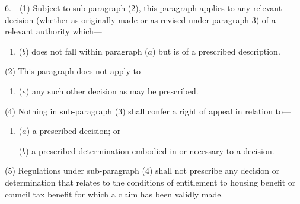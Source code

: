 \documentclass[12pt,a4paper]{article}
\begin{document}
6.---(1) Subject to sub-paragraph (2), this paragraph applies to any relevant decision (whether as originally made or as revised under paragraph 3) of a relevant authority which—
\begin{enumerate}\item[]

($b$) does not fall within paragraph ($a$)  but is of a prescribed description.
\end{enumerate}

(2) This paragraph does not apply to—
\begin{enumerate}\item[]
%
%
%

($e$) any such other decision as may be prescribed.
\end{enumerate}


(4) Nothing in sub-paragraph (3)  shall confer a right of appeal in relation to—
\begin{enumerate}\item[]
($a$) a prescribed decision; or

($b$) a prescribed determination embodied in or necessary to a decision.
\end{enumerate}

(5) Regulations under sub-paragraph (4)  shall not prescribe any decision or determination that relates to the conditions of entitlement to housing benefit or council tax benefit for which a claim has been validly made.
\end{document}
